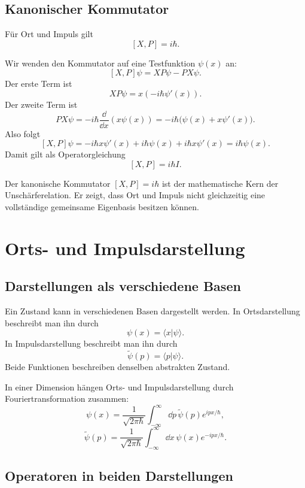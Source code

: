 \subsection{Kanonischer Kommutator}

Für Ort und Impuls gilt
\[
    [X,P]=i\hbar.
\]

\begin{derivationbox}
Wir wenden den Kommutator auf eine Testfunktion $\psi(x)$ an:
\[
    [X,P]\psi=XP\psi-PX\psi.
\]
Der erste Term ist
\[
    XP\psi=x\left(-i\hbar\psi'(x)\right).
\]
Der zweite Term ist
\[
    PX\psi=-i\hbar\frac{\dd}{\dd x}(x\psi(x))
    =-i\hbar\bigl(\psi(x)+x\psi'(x)\bigr).
\]
Also folgt
\[
    [X,P]\psi
    =-i\hbar x\psi'(x)+i\hbar\psi(x)+i\hbar x\psi'(x)
    =i\hbar\psi(x).
\]
Damit gilt als Operatorgleichung
\[
    [X,P]=i\hbar I.
\]
\end{derivationbox}

\begin{conceptbox}
Der kanonische Kommutator $[X,P]=i\hbar$ ist der mathematische Kern der Unschärferelation. Er zeigt, dass Ort und Impuls nicht gleichzeitig eine vollständige gemeinsame Eigenbasis besitzen können.
\end{conceptbox}

\section{Orts- und Impulsdarstellung}

\subsection{Darstellungen als verschiedene Basen}

Ein Zustand kann in verschiedenen Basen dargestellt werden. In Ortsdarstellung beschreibt man ihn durch
\[
    \psi(x)=\langle x|\psi\rangle.
\]
In Impulsdarstellung beschreibt man ihn durch
\[
    \tilde\psi(p)=\langle p|\psi\rangle.
\]
Beide Funktionen beschreiben denselben abstrakten Zustand.

\begin{formulabox}
In einer Dimension hängen Orts- und Impulsdarstellung durch Fouriertransformation zusammen:
\[
    \psi(x)=\frac{1}{\sqrt{2\pi\hbar}}\int_{-\infty}^{\infty}\dd p\,
    \tilde\psi(p)e^{ipx/\hbar},
\]
\[
    \tilde\psi(p)=\frac{1}{\sqrt{2\pi\hbar}}\int_{-\infty}^{\infty}\dd x\,
    \psi(x)e^{-ipx/\hbar}.
\]
\end{formulabox}

\subsection{Operatoren in beiden Darstellungen}

